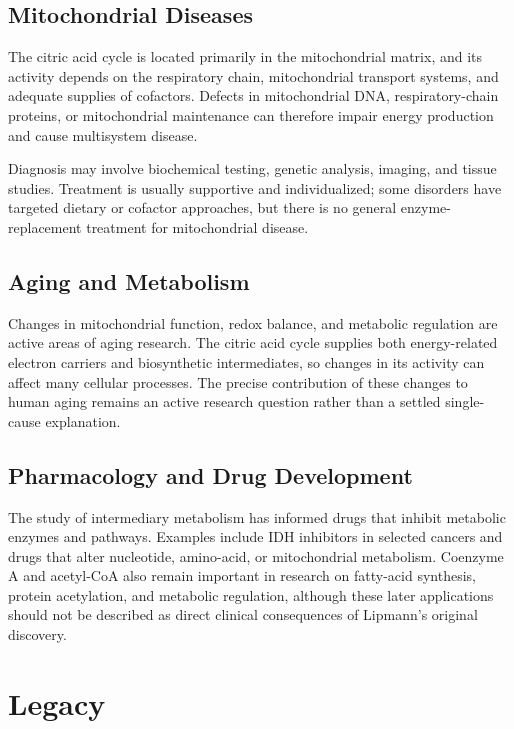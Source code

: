 \subsection{Mitochondrial Diseases}

The citric acid cycle is located primarily in the mitochondrial matrix, and its activity depends on the respiratory chain, mitochondrial transport systems, and adequate supplies of cofactors. Defects in mitochondrial DNA, respiratory-chain proteins, or mitochondrial maintenance can therefore impair energy production and cause multisystem disease.

Diagnosis may involve biochemical testing, genetic analysis, imaging, and tissue studies. Treatment is usually supportive and individualized; some disorders have targeted dietary or cofactor approaches, but there is no general enzyme-replacement treatment for mitochondrial disease.

\subsection{Aging and Metabolism}

Changes in mitochondrial function, redox balance, and metabolic regulation are active areas of aging research. The citric acid cycle supplies both energy-related electron carriers and biosynthetic intermediates, so changes in its activity can affect many cellular processes. The precise contribution of these changes to human aging remains an active research question rather than a settled single-cause explanation.

\subsection{Pharmacology and Drug Development}

The study of intermediary metabolism has informed drugs that inhibit metabolic enzymes and pathways. Examples include IDH inhibitors in selected cancers and drugs that alter nucleotide, amino-acid, or mitochondrial metabolism. Coenzyme A and acetyl-CoA also remain important in research on fatty-acid synthesis, protein acetylation, and metabolic regulation, although these later applications should not be described as direct clinical consequences of Lipmann's original discovery.

\section{Legacy}

